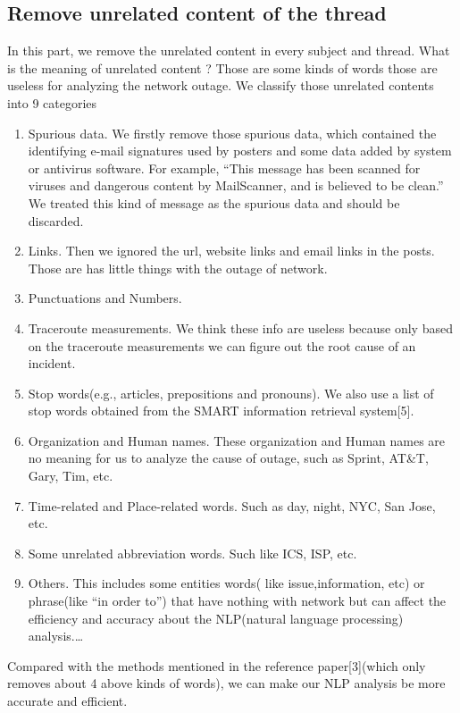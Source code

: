 \documentclass{sig-alternate}
\begin{document}
\subsection{Remove unrelated content of the thread}
In this part, we remove the unrelated content in every subject and thread. What is the meaning of unrelated content ? Those are some kinds of words those are useless for analyzing the network outage. We classify those unrelated contents into 9 categories

\begin{enumerate}
  \item Spurious data. We firstly remove those spurious data, which contained the identifying e-mail signatures used by posters and some data added by system or antivirus software. For example, “This message has been scanned for viruses and dangerous content by MailScanner, and is believed to be clean.” We treated this kind of message as the spurious data and should be discarded. 
  \item Links. Then we ignored the url, website links and email links in the posts. Those are has little things with the outage of network.
  \item Punctuations and Numbers.
  \item Traceroute measurements. We think these info are useless because only based on the traceroute measurements we can figure out the root cause of an incident.
  \item Stop words(e.g., articles, prepositions and pronouns). We also use a list of stop words obtained from the SMART information retrieval system[5].
  \item Organization and Human names. These organization and Human names are no meaning for us to analyze the cause of outage, such as Sprint, AT\&T, Gary, Tim, etc.
  \item Time-related and Place-related words. Such as day, night, NYC, San Jose, etc.
  \item Some unrelated abbreviation words. Such like ICS, ISP, etc.
  \item Others.  This includes some entities words( like issue,information, etc) or phrase(like “in order to”) that have nothing with network but can affect the efficiency and accuracy about the NLP(natural language processing) analysis.\ldots
\end{enumerate}
Compared with the methods mentioned in the reference paper[3](which only removes about 4 above kinds of words), we can make our NLP analysis be more accurate and efficient.
\end{document}
